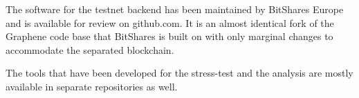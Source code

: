 The software for the testnet backend has been maintained by BitShares Europe and is
available for review on github.com. It is an almost identical fork of the
Graphene code base that BitShares is built on with only marginal changes to
accommodate the separated blockchain.

The tools that have been developed for the stress-test and the analysis are
mostly available in separate repositories as well.
